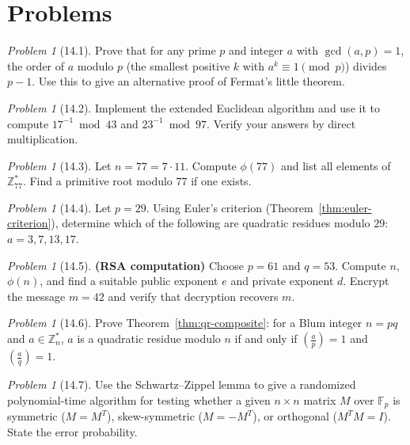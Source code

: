 \documentclass[twoside,12pt]{book}
\theoremstyle{plain}
\theoremstyle{definition}
\theoremstyle{remark}
\newtheorem{problem}[theorem]{Problem}
\begin{document}
\section*{Problems}
\label{sec:problems-14}

\begin{problem}[14.1]
Prove that for any prime $p$ and integer $a$ with $\gcd(a, p) = 1$, the order of $a$ modulo $p$ (the smallest positive $k$ with $a^k \equiv 1 \pmod{p}$) divides $p - 1$. Use this to give an alternative proof of Fermat's little theorem.
\end{problem}

\begin{problem}[14.2]
Implement the extended Euclidean algorithm and use it to compute $17^{-1} \bmod 43$ and $23^{-1} \bmod 97$. Verify your answers by direct multiplication.
\end{problem}

\begin{problem}[14.3]
Let $n = 77 = 7 \cdot 11$. Compute $\phi(77)$ and list all elements of $\mathbb{Z}_{77}^*$. Find a primitive root modulo $77$ if one exists.
\end{problem}

\begin{problem}[14.4]
Let $p = 29$. Using Euler's criterion (Theorem~\ref{thm:euler-criterion}), determine which of the following are quadratic residues modulo $29$: $a = 3, 7, 13, 17$.
\end{problem}

\begin{problem}[14.5]
\textbf{(RSA computation)} Choose $p = 61$ and $q = 53$. Compute $n$, $\phi(n)$, and find a suitable public exponent $e$ and private exponent $d$. Encrypt the message $m = 42$ and verify that decryption recovers $m$.
\end{problem}

\begin{problem}[14.6]
Prove Theorem~\ref{thm:qr-composite}: for a Blum integer $n = pq$ and $a \in \mathbb{Z}_n^*$, $a$ is a quadratic residue modulo $n$ if and only if $\left(\frac{a}{p}\right) = 1$ and $\left(\frac{a}{q}\right) = 1$.
\end{problem}

\begin{problem}[14.7]
Use the Schwartz--Zippel lemma to give a randomized polynomial-time algorithm for testing whether a given $n \times n$ matrix $M$ over $\mathbb{F}_p$ is symmetric ($M = M^T$), skew-symmetric ($M = -M^T$), or orthogonal ($M^T M = I$). State the error probability.
\end{problem}
\end{document}
